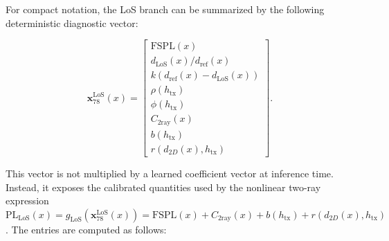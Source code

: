 For compact notation, the LoS branch can be summarized by the following
deterministic diagnostic vector:

{\small
\begin{equation}
\mathbf{x}_{78}^{\mathrm{LoS}}(x)
=
\begin{bmatrix}
\mathrm{FSPL}(x)\\
d_{\mathrm{LoS}}(x)/d_{\mathrm{ref}}(x)\\
k\!\left(d_{\mathrm{ref}}(x)-d_{\mathrm{LoS}}(x)\right)\\
\rho(h_{\mathrm{tx}})\\
\phi(h_{\mathrm{tx}})\\
C_{\mathrm{2ray}}(x)\\
b(h_{\mathrm{tx}})\\
r(d_{2D}(x),h_{\mathrm{tx}})
\end{bmatrix}.
\label{eq:x78_los_vector}
\end{equation}
}

This vector is not multiplied by a learned coefficient vector at inference
time. Instead, it exposes the calibrated quantities used by the nonlinear
two-ray expression
\(\mathrm{PL}_{\mathrm{LoS}}(x)
=g_{\mathrm{LoS}}(\mathbf{x}_{78}^{\mathrm{LoS}}(x))
=\mathrm{FSPL}(x)+C_{\mathrm{2ray}}(x)+b(h_{\mathrm{tx}})
+r(d_{2D}(x),h_{\mathrm{tx}})\).
The entries are computed as follows:

